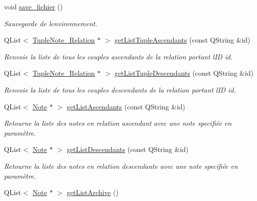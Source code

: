 \begin{DoxyCompactItemize}
void \hyperlink{class_notes_manager_a76c059043681ec4c41d91e75e06ea353}{save\+\_\+fichier} ()
\begin{DoxyCompactList}\small\item\em Sauvegarde de l\textquotesingle{}environnement. \end{DoxyCompactList}\item 
Q\+List$<$ \hyperlink{class_tuple_note___relation}{Tuple\+Note\+\_\+\+Relation} $\ast$ $>$ \hyperlink{class_notes_manager_a9f2c72d67d67c89a61f77a9b1a0ae390}{get\+List\+Tuple\+Ascendants} (const Q\+String \&id)
\begin{DoxyCompactList}\small\item\em Renvoie la liste de tous les couples ascendants de la relation portant l\textquotesingle{}ID id. \end{DoxyCompactList}\item 
Q\+List$<$ \hyperlink{class_tuple_note___relation}{Tuple\+Note\+\_\+\+Relation} $\ast$ $>$ \hyperlink{class_notes_manager_a4b8636fd8bc9d750d778585d3e4372cf}{get\+List\+Tuple\+Descendants} (const Q\+String \&id)
\begin{DoxyCompactList}\small\item\em Renvoie la liste de tous les couples descendants de la relation portant l\textquotesingle{}ID id. \end{DoxyCompactList}\item 
Q\+List$<$ \hyperlink{class_note}{Note} $\ast$ $>$ \hyperlink{class_notes_manager_ac85019776c1e8653665e24abc9d8001d}{get\+List\+Ascendants} (const Q\+String \&id)
\begin{DoxyCompactList}\small\item\em Retourne la liste des notes en relation ascendant avec une note specifiée en paramètre. \end{DoxyCompactList}\item 
Q\+List$<$ \hyperlink{class_note}{Note} $\ast$ $>$ \hyperlink{class_notes_manager_a2ed035544b433b9cddfc83fb4c081a65}{get\+List\+Descendants} (const Q\+String \&id)
\begin{DoxyCompactList}\small\item\em Retourne la liste des notes en relation descendante avec une note specifiée en paramètre. \end{DoxyCompactList}\item 
\mbox{\label{class_notes_manager_a81aee1d57c39232f870199acb356fc57}} 
Q\+List$<$ \hyperlink{class_note}{Note} $\ast$ $>$ \hyperlink{class_notes_manager_a81aee1d57c39232f870199acb356fc57}{get\+List\+Archive} ()

\end{DoxyCompactItemize}
